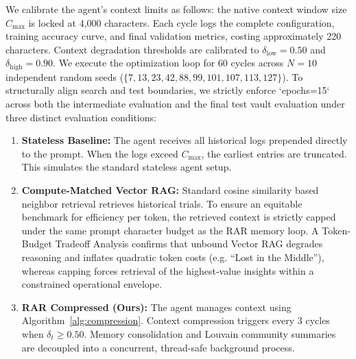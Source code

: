 \documentclass[conference]{IEEEtran}
\newcommand{\dlow}{\delta_{\mathrm{low}}}
\newcommand{\dhigh}{\delta_{\mathrm{high}}}
\newcommand{\Cmax}{C_{\max}}
\begin{document}
We calibrate the agent's context limits as follows: the native context window size $\Cmax$ is locked at 4,000 characters. Each cycle logs the complete configuration, training accuracy curve, and final validation metrics, costing approximately 220 characters. Context degradation thresholds are calibrated to $\dlow = 0.50$ and $\dhigh = 0.90$. We execute the optimization loop for 60 cycles across $N=10$ independent random seeds ($\{7, 13, 23, 42, 88, 99, 101, 107, 113, 127\}$). To structurally align search and test boundaries, we strictly enforce `epochs=15` across both the intermediate evaluation and the final test vault evaluation under three distinct evaluation conditions:
\begin{enumerate}[label=\textbf{B\arabic*.},leftmargin=2.2em,itemsep=2pt]
  \item \textbf{Stateless Baseline:} The agent receives all historical logs prepended directly to the prompt. When the logs exceed $\Cmax$, the earliest entries are truncated. This simulates the standard stateless agent setup.
  \item \textbf{Compute-Matched Vector RAG:} Standard cosine similarity based neighbor retrieval retrieves historical trials. To ensure an equitable benchmark for efficiency per token, the retrieved context is strictly capped under the same prompt character budget as the RAR memory loop. A Token-Budget Tradeoff Analysis confirms that unbound Vector RAG degrades reasoning and inflates quadratic token costs (e.g. ``Lost in the Middle''), whereas capping forces retrieval of the highest-value insights within a constrained operational envelope.
  \item \textbf{RAR Compressed (Ours):} The agent manages context using Algorithm~\ref{alg:compression}. Context compression triggers every 3 cycles when $\delta_t \geq 0.50$. Memory consolidation and Louvain community summaries are decoupled into a concurrent, thread-safe background process.
\end{enumerate}
\end{document}
